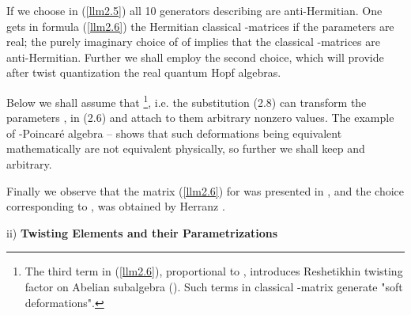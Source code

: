 \documentclass[a4paper,12pt,showkeys]{article}
\begin{document}
If we choose in (\ref{llm2.5}) \coordHE{} all 10 generators
 describing \coordHE{} are anti-Hermitian. One gets
 in formula (\ref{llm2.6})
  the Hermitian classical \coordHE{}  \coordHE{}-matrices
    if the parameters \myHighlight{$\alpha, \xi, \rho $}\coordHE{} are  real;
    the purely  imaginary choice of of \myHighlight{$\alpha, \xi, \rho$}\coordHE{} implies
    that the classical \coordHE{}-matrices are anti-Hermitian.
    Further we shall employ the second choice, which will provide
    after twist quantization the
    real quantum \coordHE{} Hopf algebras.





Below we shall assume that \coordHE{}\footnote{The
 third term in (\ref{llm2.6}), proportional to \myHighlight{$\rho$}\coordHE{}, introduces
 Reshetikhin twisting factor on Abelian subalgebra
 (\coordHE{}). Such terms in classical \coordHE{}-matrix
 generate "soft deformations".}, i.e. the
 substitution (2.8) can transform the parameters \coordHE{},
 \coordHE{} in (2.6) and attach to them arbitrary nonzero values.
The example of \myHighlight{$\kappa$}\coordHE{}-Poincar\'{e} algebra
  \cite{ll2}--\cite{ll14}
 shows that
 such deformations being equivalent
 mathematically are
 not equivalent physically, so further
 we shall keep \myHighlight{$\alpha$}\coordHE{} and \myHighlight{$\xi$}\coordHE{} arbitrary.

 Finally we observe that the
  matrix (\ref{llm2.6}) for \coordHE{} was presented in
   \cite{ll1},
and the choice corresponding to \coordHE{},
\coordHE{}  was obtained by Herranz
 \cite{ll8}.

ii) {\bf Twisting Elements and their Parametrizations}
\end{document}
